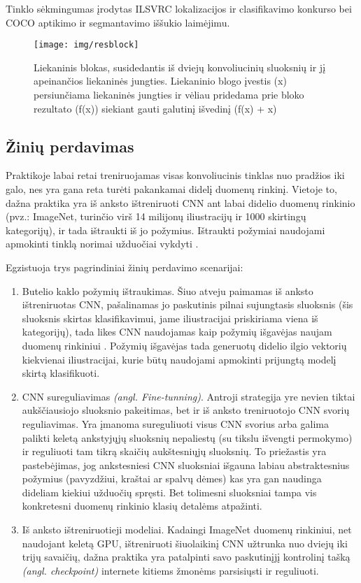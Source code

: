 \documentclass{VUMIFPSkursinis}
\begin{document}
Tinklo sėkmingumas įrodytas ILSVRC lokalizacijos ir clasifikavimo konkurso bei COCO aptikimo ir segmantavimo iššukio laimėjimu. 

\begin{figure}[H]
  \centering
  \texttt{[image: img/resblock]}
  \caption{Liekaninis blokas, susidedantis iš dviejų konvoliucinių sluoksnių ir jį apeinančios liekaninės jungties. Liekaninio blogo įvestis (x) persiunčiama liekaninės jungties ir vėliau pridedama prie bloko rezultato (f(x)) siekiant gauti galutinį išvedinį (f(x) + x) \cite{Nont}}
  \label{img:resblock}
\end{figure}

\subsection{Žinių perdavimas}

Praktikoje labai retai treniruojamas visas konvoliucinis tinklas nuo pradžios iki galo, nes yra gana reta turėti pakankamai didelį duomenų rinkinį. Vietoje to, dažna praktika yra iš anksto ištreniruoti CNN ant labai didelio duomenų rinkinio (pvz.: ImageNet, turinčio virš 14 milijonų iliustracijų ir 1000 skirtingų kategorijų), ir tada ištraukti iš jo požymius. Ištraukti požymiai naudojami apmokinti tinklą norimai užduočiai vykdyti \cite{Cal}. 

Egzistuoja trys pagrindiniai žinių perdavimo scenarijai:

\begin{enumerate}
  \item Butelio kaklo požymių ištraukimas. Šiuo atveju paimamas iš anksto ištreniruotas CNN, pašalinamas jo paskutinis pilnai sujungtasis sluoksnis (šis sluoksnis skirtas klasifikavimui, jame iliustracijai priskiriama viena iš kategorijų), tada likes CNN naudojamas kaip požymių išgavėjas naujam duomenų rinkiniui \cite{Cal}. Požymių išgavėjas tada generuotų didelio ilgio vektorių kiekvienai iliustracijai, kurie būtų naudojami apmokinti prijungtą modelį skirtą klasifikuoti.
  \item CNN sureguliavimas \textit{(angl. Fine-tunning)}. Antroji strategija yre nevien tiktai aukščiausiojo sluoksnio pakeitimas, bet ir iš anksto treniruotojo CNN svorių reguliavimas. Yra įmanoma sureguliuoti visus CNN svorius arba galima palikti keletą ankstyjųjų sluoksnių nepaliestų (su tikslu išvengti permokymo) ir reguliuoti tam tikrą skaičių aukštesniųjų sluoksnių. To priežastis yra pastebėjimas, jog ankstesniesi CNN sluoksniai išgauna labiau abstraktesnius požymius (pavyzdžiui, kraštai ar spalvų dėmes) kas yra gan naudinga dideliam kiekiui užduočių spręsti. Bet tolimesni sluoksniai tampa vis konkretesni duomenų rinkinio klasių detalėms atpažinti.
  \item Iš anksto ištreniruotieji modeliai. Kadaingi ImageNet duomenų rinkiniui, net naudojant keletą GPU, ištreniruoti šiuolaikinį CNN užtrunka nuo dviejų iki trijų savaičių, dažna praktika yra patalpinti savo paskutinįjį kontrolinį tašką \textit{(angl. checkpoint)} internete kitiems žmonėms parsisiųsti ir reguliuoti.
\end{enumerate}
\end{document}
